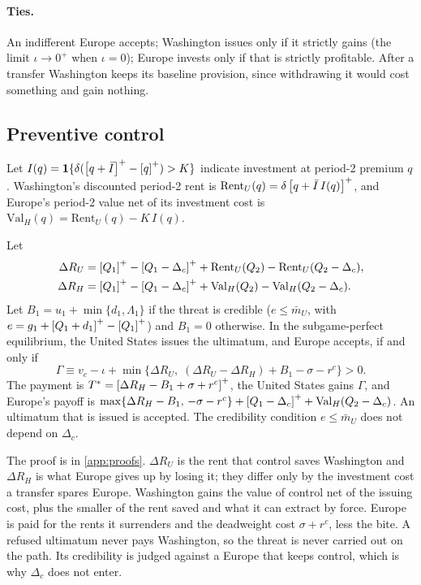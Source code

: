 \paragraph{Ties.} An indifferent Europe accepts; Washington issues only if it strictly gains (the limit $\iota\to 0^{+}$ when $\iota=0$); Europe invests only if that is strictly profitable. After a transfer Washington keeps its baseline provision, since withdrawing it would cost something and gain nothing.

\subsection{Preventive control}\label{sec:preventive}

Let $I(q)=\mathbf 1\{\delta(\left[q+\bar I\right]^{+}-\left[q\right]^{+})>K\}$ indicate investment at period-2 premium $q$. Washington's discounted period-2 rent is $\mathrm{Rent}_U(q)=\delta\left[q+\bar I\,I(q)\right]^{+}$, and Europe's period-2 value net of its investment cost is $\mathrm{Val}_H(q)=\mathrm{Rent}_U(q)-K\,I(q)$.

\begin{proposition}\label{prop:control}
Let
\begin{align*}
\Delta R_U&=\left[Q_1\right]^{+}-\left[Q_1-\Delta_c\right]^{+}+\mathrm{Rent}_U(Q_2)-\mathrm{Rent}_U(Q_2-\Delta_c),\\
\Delta R_H&=\left[Q_1\right]^{+}-\left[Q_1-\Delta_c\right]^{+}+\mathrm{Val}_H(Q_2)-\mathrm{Val}_H(Q_2-\Delta_c).
\end{align*}
Let $B_1=u_1+\min\{d_1,\Lambda_1\}$ if the threat is credible ($e\le\bar m_U$, with $e=g_1+\left[Q_1+d_1\right]^{+}-\left[Q_1\right]^{+}$) and $B_1=0$ otherwise. In the subgame-perfect equilibrium, the United States issues the ultimatum, and Europe accepts, if and only if
\begin{equation*}
\Gamma\equiv v_c-\iota+\min\{\Delta R_U,\;(\Delta R_U-\Delta R_H)+B_1-\sigma-r^c\}>0 .
\end{equation*}
The payment is $T^*=\left[\Delta R_H-B_1+\sigma+r^c\right]^{+}$, the United States gains $\Gamma$, and Europe's payoff is
$\max\{\Delta R_H-B_1,\,-\sigma-r^c\}+\left[Q_1-\Delta_c\right]^{+}+\mathrm{Val}_H(Q_2-\Delta_c)$.
An ultimatum that is issued is accepted. The credibility condition $e\le\bar m_U$ does not depend on $\Delta_c$.
\end{proposition}

The proof is in \cref{app:proofs}. $\Delta R_U$ is the rent that control saves Washington and $\Delta R_H$ is what Europe gives up by losing it; they differ only by the investment cost a transfer spares Europe. Washington gains the value of control net of the issuing cost, plus the smaller of the rent saved and what it can extract by force. Europe is paid for the rents it surrenders and the deadweight cost $\sigma+r^c$, less the bite. A refused ultimatum never pays Washington, so the threat is never carried out on the path. Its credibility is judged against a Europe that keeps control, which is why $\Delta_c$ does not enter.

